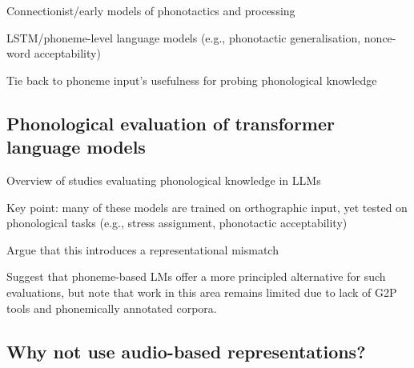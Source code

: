Connectionist/early models of phonotactics and processing

LSTM/phoneme-level language models (e.g., phonotactic generalisation, nonce-word acceptability)

Tie back to phoneme input’s usefulness for probing phonological knowledge

\subsection{Phonological evaluation of transformer language models}

Overview of studies evaluating phonological knowledge in LLMs

Key point: many of these models are trained on orthographic input, yet tested on phonological tasks (e.g., stress assignment, phonotactic acceptability)

Argue that this introduces a representational mismatch

Suggest that phoneme-based LMs offer a more principled alternative for such evaluations, but note that work in this area remains limited due to lack of G2P tools and phonemically annotated corpora.



\subsection{Why not use audio-based representations?}\label{sec:12-whynot}


